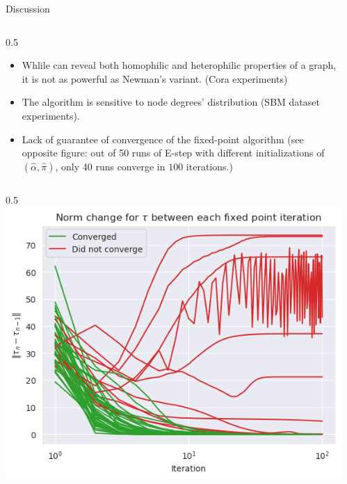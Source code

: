 \documentclass[final]{beamer}
\newlength{\sepwidth}
\newlength{\colwidth}
\newcommand{\separatorcolumn}{\begin{column}{\sepwidth}\end{column}}
\begin{document}
\begin{frame}[t]
\begin{columns}[t]
\begin{column}{\colwidth}
      \begin{exampleblock}{Discussion}
        \begin{column}{0.5\colwidth}
          \justifying
          \begin{itemize}
            \item Whlile \cite{main_article} can reveal both homophilic and heterophilic properties of a graph, it is not as powerful as Newman's variant. (Cora experiments)
            \item The algorithm is sensitive to node degrees' distribution (SBM dataset experiments).
            \item Lack of guarantee of convergence of the fixed-point algorithm (see opposite figure: out of 50 runs of E-step with different initializations of $(\hat{\alpha}, \hat{\pi})$, only 40 runs converge in $100$ iterations.)
          \end{itemize}
        \end{column}
        \begin{column}{0.5\colwidth}
          \centering
          \includegraphics[width=0.76\linewidth]{figures/fixed-point-convergence.png}
        \end{column}
      \end{exampleblock}

    \end{column}
    \separatorcolumn



  \end{columns}
\end{frame}
\end{document}
